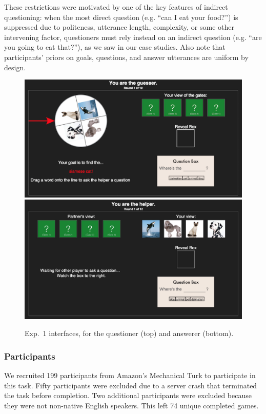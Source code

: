 \documentclass[12pt, floatsintext, jou]{apa6}
\begin{document}
These restrictions were motivated by one of the key features of indirect questioning: when the most direct question (e.g. ``can I eat your food?'') is suppressed due to politeness, utterance length, complexity, or some other intervening factor, questioners must rely instead on an indirect question (e.g. ``are you going to eat that?''), as we saw in our case studies. Also note that participants' priors on goals, questions, and answer utterances are uniform by design. 

\begin{figure}[t!]
\begin{center}
\includegraphics[scale = .3]{Exp4GuesserViewStart}
\includegraphics[scale = .15]{Exp4HelperViewStart}
\end{center}
\caption{Exp.~1 interfaces, for the questioner (top) and answerer (bottom).}
\label{fig:expviews}
\end{figure}
\subsubsection{Participants} We recruited 199 participants from Amazon's Mechanical Turk to participate in this task. Fifty participants were excluded due to a server crash that terminated the task before completion. Two additional participants were excluded because they were not non-native English speakers. This left 74 unique completed games.
\end{document}
